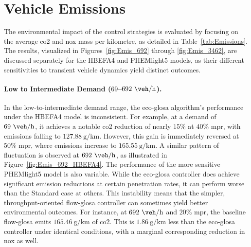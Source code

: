 \section{Vehicle Emissions}
\label{sec:Results_Emissions}

The environmental impact of the control strategies is evaluated by focusing on the average \ac{co2} and \ac{nox} mass per kilometre, as detailed in Table~\vref{tab:Emissions}. The results, visualized in Figures~\vref{fig:Emis_692} through \vref{fig:Emis_3462}, are discussed separately for the HBEFA4 and PHEMlight5 models, as their different sensitivities to transient vehicle dynamics yield distinct outcomes.

\paragraph{Low to Intermediate Demand ($69$--$692~\unit{\veh\per\hour}$).}
In the low-to-intermediate demand range, the \ac{eco-glosa} algorithm's performance under the HBEFA4 model is inconsistent. For example, at a demand of $69~\unit{\veh\per\hour}$, it achieves a notable \ac{co2} reduction of nearly $15\%$ at $40\%$ \ac{mpr}, with emissions falling to $127.88~\unit{\gram\per\kilo\metre}$. However, this gain is immediately reversed at $50\%$ \ac{mpr}, where emissions increase to $165.55~\unit{\gram\per\kilo\metre}$. A similar pattern of fluctuation is observed at $692~\unit{\veh\per\hour}$, as illustrated in Figure~\vref{fig:Emis_692_HBEFA4}.
\mynewline
The performance of the more sensitive PHEMlight5 model is also variable. While the \ac{eco-glosa} controller does achieve significant emission reductions at certain penetration rates, it can perform worse than the Standard case at others. This instability means that the simpler, throughput-oriented \ac{flow-glosa} controller can sometimes yield better environmental outcomes. For instance, at $692~\unit{\veh\per\hour}$ and $20\%$ \ac{mpr}, the baseline \ac{flow-glosa} emits $165.46~\unit{\gram\per\kilo\metre}$ of \ac{co2}. This is $1.86~\unit{\gram\per\kilo\metre}$ less than the \ac{eco-glosa} controller under identical conditions, with a marginal corresponding reduction in \ac{nox} as well.

